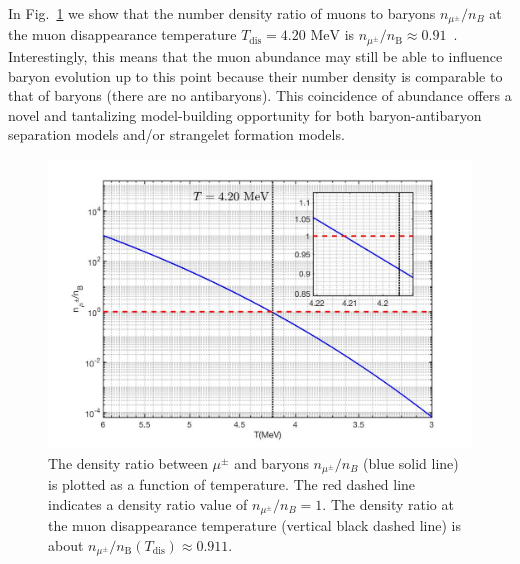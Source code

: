 \documentclass[universe,article,submit,moreauthors,pdftex,a4paper]{Definitions/mdpi}
\newcommand{\MeV}{\text{ MeV}}
\newcommand*{\rf}[1]{Fig.~{\ref{#1}}}
\newcommand*{\xblue}{\color{blue}}
\begin{document}
In \rf{muonRatio_fig} we show that the number density ratio of muons to baryons $n_{\mu^{\pm}}/n_{B}$ at the muon disappearance temperature $T_\mathrm{dis} = 4.20\MeV$ is $n_{\mu^\pm}/n_\mathrm{B}\approx0.91$~\cite{Yang:2021bko}. {\xblue  Interestingly, this means that the muon abundance may still be able to influence baryon evolution up to this point because their number density is comparable to that of baryons (there are no antibaryons). This coincidence of abundance offers a novel and tantalizing model-building opportunity for  both baryon-antibaryon separation models and/or strangelet formation models.}

\begin{figure}[ht]
\centering
\includegraphics[width=0.9\columnwidth]{./plots/DensityRatio_new2.jpg}
\caption{The density ratio between $\mu^\pm$ and baryons $n_{\mu^{\pm}}/n_{B}$ (blue solid line) is plotted as a function of temperature. The red dashed line indicates a density ratio value of $n_{\mu^{\pm}}/n_{B}=1$. The density ratio at the muon disappearance temperature (vertical black dashed line) is about $n_{\mu^\pm}/n_\mathrm{B}(T_\mathrm{dis})\approx0.911$.}
\label{muonRatio_fig} 
\end{figure}

\end{document}
